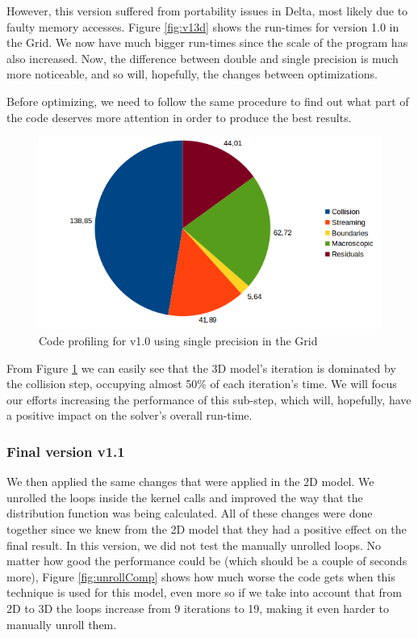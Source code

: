 \documentclass[12pt, openany]{book}
\begin{document}
 However, this version suffered from portability issues in Delta, most likely due to faulty memory accesses. Figure \ref{fig:v13d} shows the run-times for version 1.0 in the Grid. We now have much bigger run-times since the scale of the program has also increased. Now, the difference between double and single precision is much more noticeable, and so will, hopefully, the changes between optimizations. \par
 Before optimizing, we need to follow the same procedure to find out what part of the code deserves more attention in order to produce the best results.
 
    \begin{figure}[H]
    	\centering
    	\includegraphics[width=\linewidth]{Resources/Images/v13dprofile.png}
    	\caption{Code profiling for v1.0 using single precision in the Grid}
    	\label{fig:v13dprofile}
    \end{figure}
 
 From Figure \ref{fig:v13dprofile} we can easily see that the 3D model's iteration is dominated by the collision step, occupying almost 50\% of each iteration's time. We will focus our efforts increasing the performance of this sub-step, which will, hopefully, have a positive impact on the solver's overall run-time.
 
\subsubsection{Final version v1.1}
We then applied the same changes that were applied in the 2D model. We unrolled the loops inside the kernel calls and improved the way that the distribution function was being calculated. All of these changes were done together since we knew from the 2D model that they had a positive effect on the final result. In this version, we did not test the manually unrolled loops. No matter how good the performance could be (which should be a couple of seconds more), Figure \ref{fig:unrollComp} shows how much worse the code gets when this technique is used for this model, even more so if we take into account that from 2D to 3D the loops increase from 9 iterations to 19, making it even harder to manually unroll them.
\end{document}
